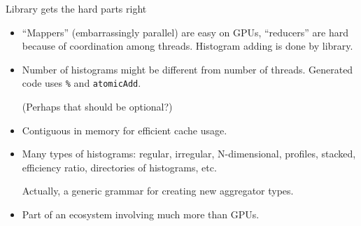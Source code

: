 \documentclass{beamer}
\begin{document}
\begin{frame}{Library gets the hard parts right}
\vspace{0.5 cm}
\begin{itemize}\setlength{\itemsep}{0.35 cm}
\item ``Mappers'' (embarrassingly parallel) are easy on GPUs, ``reducers'' are hard because of coordination among threads. Histogram adding is done by library.

\item Number of histograms might be different from number of threads. Generated code uses {\tt \%} and {\tt atomicAdd}.

\vspace{0.2 cm}
(Perhaps that should be optional?)

\item Contiguous in memory for efficient cache usage.

\item Many types of histograms: regular, irregular, N-dimensional, profiles, stacked, efficiency ratio, directories of histograms, etc.

\vspace{0.2 cm}
Actually, a generic grammar for creating new aggregator types.

\item Part of an ecosystem involving much more than GPUs.
\end{itemize}
\end{frame}
\end{document}
